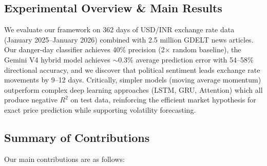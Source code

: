 \documentclass[11pt]{article}
\begin{document}
\subsection{Experimental Overview \& Main Results}

We evaluate our framework on 362 days of USD/INR exchange rate data (January 2025--January 2026) combined with 2.5 million GDELT news articles. Our danger-day classifier achieves 40\% precision (2$\times$ random baseline), the Gemini V4 hybrid model achieves $\sim$0.3\% average prediction error with 54--58\% directional accuracy, and we discover that political sentiment leads exchange rate movements by 9--12 days. Critically, simpler models (moving average momentum) outperform complex deep learning approaches (LSTM, GRU, Attention) which all produce negative $R^2$ on test data, reinforcing the efficient market hypothesis for exact price prediction while supporting volatility forecasting.

\subsection{Summary of Contributions}

Our main contributions are as follows:
\end{document}
